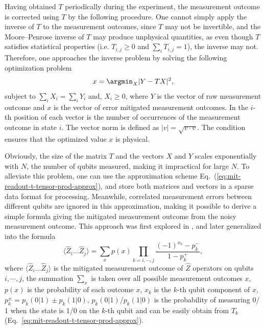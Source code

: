 Having obtained $T$ periodically during the experiment, the measurement outcome is corrected using $T$ by the following procedure. One cannot simply apply the inverse of $T$ to the measurement outcomes, since $T$ may not be invertible, and the Moore–Penrose inverse of $T$ may produce unphysical quantities, as even though $T$ satisfies statistical properties (i.e. $T_{i,j}\geq 0$ and $\sum_i T_{i,j}=1$), the inverse may not. Therefore, one approaches the inverse problem by solving the following optimization problem \cite{Qiskit}
\begin{equation}
    x = \argmin_X |Y - T X|^2,
\end{equation}
subject to $\sum_i X_i = \sum_i Y_i$ and, $X_i \geqslant 0$,
where $Y$ is the vector of raw measurement outcome and $x$ is the vector of error mitigated measurement outcomes. In the $i$-th position of each vector is the number of occurrences of the measurement outcome in state $i$. The vector norm is defined as $|v| = \sqrt{v\cdot v}$. The condition ensures that the optimized value $x$ is physical.

Obviously, the size of the matrix $T$ and the vectors $X$ and $Y$ scales exponentially with $N$, the number of qubits measured, making it impractical for large $N$. To alleviate this problem, one can use the approximation scheme Eq.~(\ref{eq:mit-readout-t-tensor-prod-approx}), and store both matrices and vectors in a sparse data format for processing.
Meanwhile, correlated measurement errors between different qubits are ignored in this approximation, making it possible to derive a simple formula giving the mitigated measurement outcome from the noisy measurement outcome. This approach was first explored in \citet{Kandala2017}, and later generalized \cite{yeter-aydenizPracticalQuantumComputation2020,yeter-aydenizScalarQuantumField2019} into the formula
\begin{equation}
    \langle \hat{Z}_{i} \dotsc \hat{Z}_{j}\rangle 
    = \sum_{x} p(x)\prod _{k=i,\cdots ,j}\frac{(-1)^{x_{k}} -p_{k}^{-}}{1-p_{k}^{+}},
\end{equation}
where $\langle \hat{Z}_{i} \dotsc \hat{Z}_{j}\rangle$ is the mitigated measurement outcome of $\hat{Z}$ operators on qubits $i,\cdots,j$,
the summation $\sum_x$ is taken over all possible measurement outcomes $x$, $p(x)$ is the probability of each outcome $x$, $x_k$ is the $k$-th qubit component of $x$, $p_k^{\pm} = p_k(0|1)\pm p_k(1|0)$, $p_k(0|1)$/$p_k(1|0)$ is the probability of measuring $0$/$1$ when the state is $1$/$0$ on the $k$-th qubit and can be easily obtain from $T_k$ (Eq.~\ref{eq:mit-readout-t-tensor-prod-approx}).

